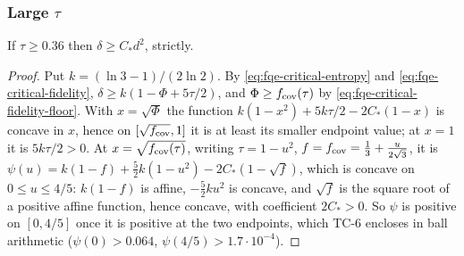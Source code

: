 \subsubsection*{Large $\tau$}
\begin{lemma}\label{lem:fqe-critical-large-tau}
If $\tau\ge0.36$ then $\delta\ge C_*d^2$, strictly.
\end{lemma}
\begin{proof}
Put $k=(\ln3-1)/(2\ln2)$.  By \eqref{eq:fqe-critical-entropy} and \eqref{eq:fqe-critical-fidelity},
$\delta\ge k(1-\Phi+5\tau/2)$, and $\Phi\ge f_{\rm cov}(\tau)$ by \eqref{eq:fqe-critical-fidelity-floor}.  With
$x=\sqrt{\Phi}$ the function $k(1-x^2)+5k\tau/2-2C_*(1-x)$ is concave in $x$, hence on $[\sqrt{f_{\rm cov}},1]$ it
is at least its smaller endpoint value; at $x=1$ it is $5k\tau/2>0$.  At $x=\sqrt{f_{\rm cov}(\tau)}$, writing
$\tau=1-u^2$, $f=f_{\rm cov}=\frac13+\frac u{2\sqrt3}$, it is
$\psi(u)=k(1-f)+\frac52k(1-u^2)-2C_*(1-\sqrt f)$, which is concave on $0\le u\le4/5$: $k(1-f)$ is affine,
$-\frac52ku^2$ is concave, and $\sqrt f$ is the square root of a positive affine function, hence concave, with coefficient
$2C_*>0$.  So $\psi$ is positive on $[0,4/5]$ once it is positive at the two endpoints, which TC-6 encloses in ball
arithmetic ($\psi(0)>0.064$, $\psi(4/5)>1.7\cdot10^{-4}$).
\end{proof}

